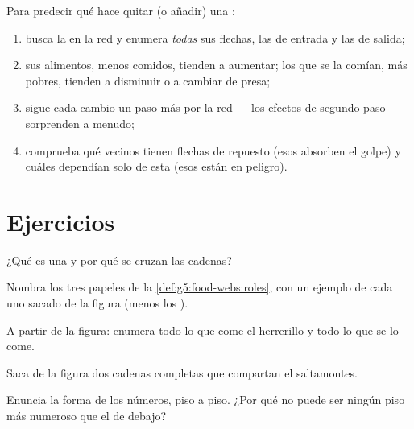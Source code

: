 \begin{method}\label{met:g5:food-webs:predict}
Para predecir qué hace quitar (o añadir) una :
\begin{enumerate}
  \item busca la  en la red y enumera \emph{todas} sus flechas,
        las de entrada y las de salida;
  \item sus alimentos, menos comidos, tienden a aumentar; los que se
        la comían, más pobres, tienden a disminuir o a cambiar de presa;
  \item sigue cada cambio un paso más por la red --- los efectos de
        segundo paso sorprenden a menudo;
  \item comprueba qué vecinos tienen flechas de repuesto (esos absorben
        el golpe) y cuáles dependían solo de esta  (esos están
        en peligro).
\end{enumerate}
\end{method}

\section{Ejercicios}

\begin{exercise}[$\star$]\label{exo:g5:food-webs:1}
¿Qué es una  y por qué se cruzan las cadenas?
\end{exercise}

\begin{exercise}[$\star$]\label{exo:g5:food-webs:2}
Nombra los tres papeles de la \cref{def:g5:food-webs:roles}, con un
ejemplo de cada uno sacado de la figura (menos los ).
\end{exercise}

\begin{exercise}[$\star$]\label{exo:g5:food-webs:3}
A partir de la figura: enumera todo lo que come el herrerillo y todo
lo que se lo come.
\end{exercise}

\begin{exercise}[$\star$]\label{exo:g5:food-webs:4}
Saca de la figura dos cadenas completas que compartan el saltamontes.
\end{exercise}

\begin{exercise}[$\star$]\label{exo:g5:food-webs:5}
Enuncia la forma de los números, piso a piso. ¿Por qué no puede ser
ningún piso más numeroso que el de debajo?
\end{exercise}


